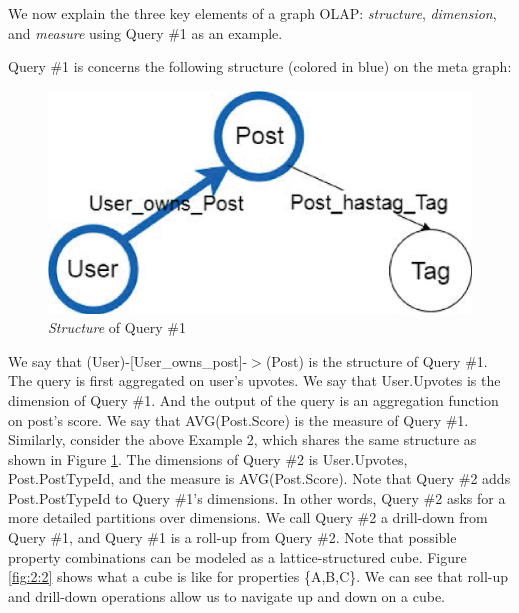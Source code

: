 We now explain the three key elements of a graph OLAP: \textit{structure}, \textit{dimension}, and \textit{measure}  using Query \#1 as an example.


Query \#1 is concerns the following structure (colored in blue) on the meta graph:

\begin{figure}[H]
\centering
\includegraphics[scale=0.5]{pic/meta1.eps}
\caption{\textit{Structure} of Query \#1}
\label{fig:2:1}
\end{figure}



We say that (User)-[User\_owns\_post]-$>$(Post) is the structure of Query \#1. The query is first aggregated on user’s upvotes. We say that {User.Upvotes} is the dimension of Query \#1. And the output of the query is an aggregation function on post’s score.  We say that {AVG(Post.Score)} is the measure of Query \#1. Similarly, consider the above Example 2, which shares the same structure as shown in Figure \ref{fig:2:1}. The dimensions of Query \#2 is {User.Upvotes, Post.PostTypeId}, and the measure is {AVG(Post.Score)}. Note that Query \#2 adds Post.PostTypeId to Query \#1’s dimensions. In other words, Query \#2 asks for a more detailed partitions over dimensions. We call Query \#2 a drill-down from Query \#1, and  Query \#1 is a roll-up from Query \#2. Note that possible property combinations can be modeled as a lattice-structured cube. Figure \ref{fig:2:2} shows what a cube is like for properties \{A,B,C\}. We can see that roll-up and drill-down operations allow us to navigate up and down on a cube.


